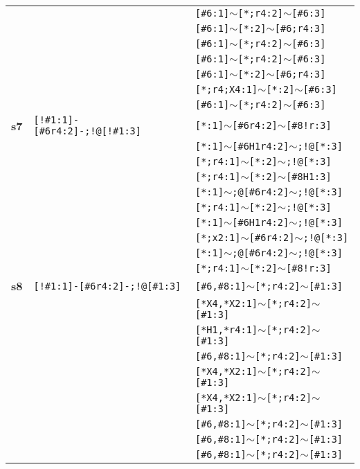 \begin{longtable}{>{\baselineskip=10pt}p{} >{\baselineskip=10pt}p{} >{\baselineskip=10pt}p{}}
 &  & \texttt{[\#6:1]$\sim$[*;r4:2]$\sim$[\#6:3]} \\ 
 &  & \texttt{[\#6:1]$\sim$[*:2]$\sim$[\#6;r4:3]} \\ 
 &  & \texttt{[\#6:1]$\sim$[*;r4:2]$\sim$[\#6:3]} \\ 
 &  & \texttt{[\#6:1]$\sim$[*;r4:2]$\sim$[\#6:3]} \\ 
 &  & \texttt{[\#6:1]$\sim$[*:2]$\sim$[\#6;r4:3]} \\ 
 &  & \texttt{[*;r4;X4:1]$\sim$[*:2]$\sim$[\#6:3]} \\ 
 &  & \texttt{[\#6:1]$\sim$[*;r4:2]$\sim$[\#6:3]} \\ 
\hline 
\textbf{s7} & \texttt{[!\#1:1]-[\#6r4:2]-;!@[!\#1:3]} & \texttt{[*:1]$\sim$[\#6r4:2]$\sim$[\#8!r:3]} \\ 
 &  & \texttt{[*:1]$\sim$[\#6H1r4:2]$\sim$;!@[*:3]} \\ 
 &  & \texttt{[*;r4:1]$\sim$[*:2]$\sim$;!@[*:3]} \\ 
 &  & \texttt{[*;r4:1]$\sim$[*:2]$\sim$[\#8H1:3]} \\ 
 &  & \texttt{[*:1]$\sim$;@[\#6r4:2]$\sim$;!@[*:3]} \\ 
 &  & \texttt{[*;r4:1]$\sim$[*:2]$\sim$;!@[*:3]} \\ 
 &  & \texttt{[*:1]$\sim$[\#6H1r4:2]$\sim$;!@[*:3]} \\ 
 &  & \texttt{[*;x2:1]$\sim$[\#6r4:2]$\sim$;!@[*:3]} \\ 
 &  & \texttt{[*:1]$\sim$;@[\#6r4:2]$\sim$;!@[*:3]} \\ 
 &  & \texttt{[*;r4:1]$\sim$[*:2]$\sim$[\#8!r:3]} \\ 
\hline 
\textbf{s8} & \texttt{[!\#1:1]-[\#6r4:2]-;!@[\#1:3]} & \texttt{[\#6,\#8:1]$\sim$[*;r4:2]$\sim$[\#1:3]} \\ 
 &  & \texttt{[*X4,*X2:1]$\sim$[*;r4:2]$\sim$[\#1:3]} \\ 
 &  & \texttt{[*H1,*r4:1]$\sim$[*;r4:2]$\sim$[\#1:3]} \\ 
 &  & \texttt{[\#6,\#8:1]$\sim$[*;r4:2]$\sim$[\#1:3]} \\ 
 &  & \texttt{[*X4,*X2:1]$\sim$[*;r4:2]$\sim$[\#1:3]} \\ 
 &  & \texttt{[*X4,*X2:1]$\sim$[*;r4:2]$\sim$[\#1:3]} \\ 
 &  & \texttt{[\#6,\#8:1]$\sim$[*;r4:2]$\sim$[\#1:3]} \\ 
 &  & \texttt{[\#6,\#8:1]$\sim$[*;r4:2]$\sim$[\#1:3]} \\ 
 &  & \texttt{[\#6,\#8:1]$\sim$[*;r4:2]$\sim$[\#1:3]} \\ 

\end{longtable}
